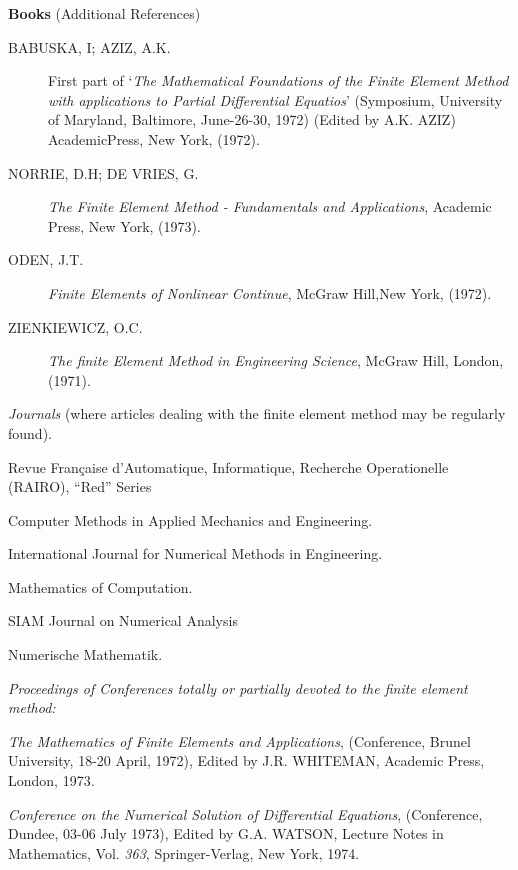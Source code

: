 \noindent
{\bf Books} (Additional References)

\begin{description}
\item[BABUSKA, I; AZIZ, A.K.] First part of `{\em The Mathematical
  Foundations of the Finite Element Method with applications to
  Partial Differential Equatios}' (Symposium, University of Maryland,
  Baltimore, June-26-30, 1972) (Edited by A.K. AZIZ) Academic\break Press,
  New York, (1972).

\item[NORRIE, D.H; DE VRIES, G.] {\em The Finite Element Method -
  Fundamentals and Applications}, Academic Press, New York, (1973).

\item[ODEN, J.T.] {\em Finite Elements of Nonlinear Continue}, McGraw
  Hill,\break  New York, (1972).

\item[ZIENKIEWICZ, O.C.] {\em The finite Element Method in Engineering
  Science}, McGraw Hill, London, (1971).
\end{description}

{\em Journals} (where articles dealing with the finite element method
may be regularly found).

Revue Fran\c{c}aise d'Automatique, Informatique, Recherche
Operationelle (RAIRO), ``Red'' Series

Computer Methods in Applied Mechanics and Engineering.

International Journal for Numerical Methods in Engineering.

Mathematics of Computation.

SIAM Journal on Numerical Analysis

Numerische Mathematik.

{\em Proceedings of Conferences totally or partially devoted to the
  finite element method:}

{\em The Mathematics of Finite Elements and Applications},
(Conference, Brunel University, 18-20 April, 1972), Edited by
J.R. WHITEMAN, Academic Press, London, 1973.

{\em Conference on the Numerical Solution of Differential Equations},
(Conference, Dundee, 03-06 July 1973), Edited by G.A. WATSON, Lecture
Notes in Mathematics, Vol. {\em 363}, Springer-Verlag, New York, 1974.

